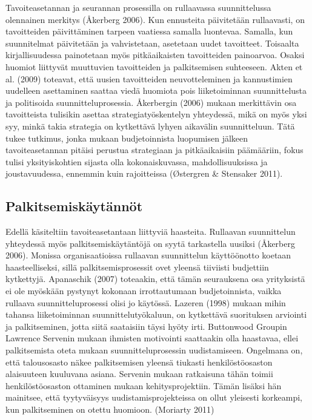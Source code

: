 \documentclass[12pt,a4paper,oneside,pdftex]{report}
\begin{document}
Tavoiteasetannan ja seurannan prosessilla on rullaavassa suunnittelussa olennainen merkitys (Åkerberg 2006). Kun ennusteita päivitetään rullaavasti, on tavoitteiden päivittäminen tarpeen vaatiessa samalla luontevaa. Samalla, kun suunnitelmat päivitetään ja vahvistetaan, asetetaan uudet tavoitteet. Toisaalta kirjallisuudessa painotetaan myös pitkäaikaisten tavoitteiden painoarvoa. Osaksi huomiot liittyvät muuttuvien tavoitteiden ja palkitsemisen suhteeseen. Akten et al. (2009) toteavat, että uusien tavoitteiden neuvotteleminen ja kannustimien uudelleen asettaminen saattaa viedä huomiota pois liiketoiminnan suunnittelusta ja politisoida suunnitteluprosessia. Åkerbergin (2006) mukaan merkittävin osa tavoitteista tulisikin asettaa strategiatyöskentelyn yhteydessä, mikä on myös yksi syy, minkä takia strategia on kytkettävä lyhyen aikavälin suunnitteluun. Tätä tukee tutkimus, jonka mukaan budjetoinnista luopumisen jälkeen tavoiteasetannan pitäisi perustua strategiaan ja pitkäaikaisiin päämääriin, fokus tulisi yksityiskohtien sijasta olla kokonaiskuvassa, mahdollisuuksissa ja joustavuudessa, ennemmin kuin rajoitteissa (Østergren & Stensaker 2011).

\subsection{Palkitsemiskäytännöt}

Edellä käsiteltiin tavoiteasetantaan liittyviä haasteita. Rullaavan suunnittelun yhteydessä myös palkitsemiskäytäntöjä on syytä tarkastella uusiksi (Åkerberg 2006). Monissa organisaatioissa rullaavan suunnittelun käyttöönotto koetaan haasteelliseksi, sillä palkitsemisprosessit ovet yleensä tiiviisti budjettiin kytkettyjä. Apanaschik (2007) toteaakin, että tämän seurauksena osa yrityksistä ei ole myöskään pystynyt kokonaan irrottautumaan budjetoinnista, vaikka rullaava suunnitteluprosessi olisi jo käytössä. Lazeren (1998) mukaan mihin tahansa liiketoiminnan suunnittelutyökaluun, on kytkettävä suorituksen arviointi ja palkitseminen, jotta siitä saataisiin täysi hyöty irti. Buttonwood Groupin Lawrence Servenin mukaan ihmisten motivointi saattaakin olla haastavaa, ellei palkitsemista oteta mukaan suunnitteluprosessin uudistamiseen. Ongelmana on, että talousosasto näkee palkitsemisen yleensä tiukasti henkilöstöosaston alaisuuteen kuuluvana asiana. Servenin mukaan ratkaisuna tähän toimii henkilöstöosaston ottaminen mukaan kehitysprojektiin. Tämän lisäksi hän mainitsee, että tyytyväisyys uudistamisprojekteissa on ollut yleisesti korkeampi, kun palkitseminen on otettu huomioon. (Moriarty 2011)
\end{document}
